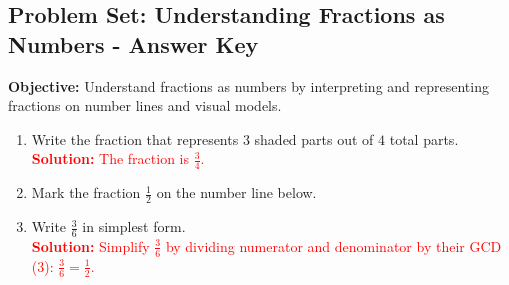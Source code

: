 \documentclass[12pt]{article}
\title{}
\date{}
\begin{document}
\subsection*{Problem Set: Understanding Fractions as Numbers - Answer Key}
\onehalfspacing

\begin{tcolorbox}[colframe=black!40, colback=gray!5, 
coltitle=black, colbacktitle=black!20, fonttitle=\bfseries\Large, 
title=Learning Objective, halign title=center, left=5pt, right=5pt, top=5pt, bottom=15pt]
\textbf{Objective:} Understand fractions as numbers by interpreting and representing fractions on number lines and visual models.
\end{tcolorbox}

\begin{tcolorbox}[colframe=black!60, colback=white, 
coltitle=black, colbacktitle=black!15, fonttitle=\bfseries\Large, 
title=Exercises, halign title=center, left=10pt, right=10pt, top=10pt, bottom=45pt]
\begin{enumerate}[itemsep=1.5em]
    \item Write the fraction that represents \(3\) shaded parts out of \(4\) total parts.\\
    \textcolor{red}{\textbf{Solution:} The fraction is \(\displaystyle \frac{3}{4}\).}

    \item Mark the fraction \(\displaystyle\frac{1}{2}\) on the number line below.  
    \begin{center}
    \end{center}

    \item Write \(\displaystyle\frac{3}{6}\) in simplest form.\\
    \textcolor{red}{\textbf{Solution:} Simplify \(\displaystyle\frac{3}{6}\) by dividing numerator and denominator by their GCD (3): \(\displaystyle\frac{3}{6} = \frac{1}{2}\).}


\end{enumerate}
\end{tcolorbox}
\end{document}

